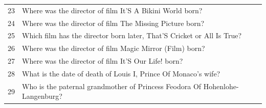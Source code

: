 \begin{tabular}{ll}
23 & Where was the director of film It'S A Bikini World born? \\
24 & Where was the director of film The Missing Picture born? \\
25 & Which film has the director born later, That'S Cricket or All Is True? \\
26 & Where was the director of film Magic Mirror (Film) born? \\
27 & Where was the director of film It'S Our Life! born? \\
28 & What is the date of death of Louis I, Prince Of Monaco's wife? \\
29 & Who is the paternal grandmother of Princess Feodora Of Hohenlohe-Langenburg? \\
\bottomrule
\end{tabular}
